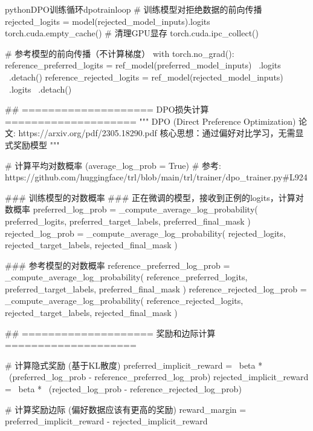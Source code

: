 \documentclass[lang=cn,newtx,10pt,scheme=chinese]{elegantbook}
\begin{document}
\begin{codebox}{python}{DPO训练循环}{dpotrainloop}
    # 训练模型对拒绝数据的前向传播
    rejected_logits = model(rejected_model_inputs).logits
    torch.cuda.empty_cache()  # 清理GPU显存
    torch.cuda.ipc_collect()

    # 参考模型的前向传播（不计算梯度）
    with torch.no_grad():
        reference_preferred_logits = ref_model(preferred_model_inputs) \
            .logits                                                    \
            .detach()
        reference_rejected_logits = ref_model(rejected_model_inputs)   \
            .logits                                                    \
            .detach()

    ## ==================== DPO损失计算 ====================
    """
    DPO (Direct Preference Optimization) 论文: https://arxiv.org/pdf/2305.18290.pdf
    核心思想：通过偏好对比学习，无需显式奖励模型
    """
    
    # 计算平均对数概率 (average_log_prob = True)
    # 参考: https://github.com/huggingface/trl/blob/main/trl/trainer/dpo_trainer.py#L924
    
    ### 训练模型的对数概率
    ### 正在微调的模型，接收到正例的logits，计算对数概率
    preferred_log_prob = _compute_average_log_probability(
        preferred_logits,
        preferred_target_labels,
        preferred_final_mask
    )
    rejected_log_prob = _compute_average_log_probability(
        rejected_logits,
        rejected_target_labels,
        rejected_final_mask
    )
    
    ### 参考模型的对数概率
    reference_preferred_log_prob = _compute_average_log_probability(
        reference_preferred_logits,
        preferred_target_labels,
        preferred_final_mask
    )
    reference_rejected_log_prob = _compute_average_log_probability(
        reference_rejected_logits,
        rejected_target_labels,
        rejected_final_mask
    )

    ## ==================== 奖励和边际计算 ====================
    
    # 计算隐式奖励 (基于KL散度)
    preferred_implicit_reward =                              \
        beta *                                               \
        (preferred_log_prob - reference_preferred_log_prob)
    rejected_implicit_reward =                               \
        beta *                                               \
        (rejected_log_prob - reference_rejected_log_prob)
    
    # 计算奖励边际 (偏好数据应该有更高的奖励)
    reward_margin = preferred_implicit_reward - rejected_implicit_reward
    

\end{codebox}
\end{document}
